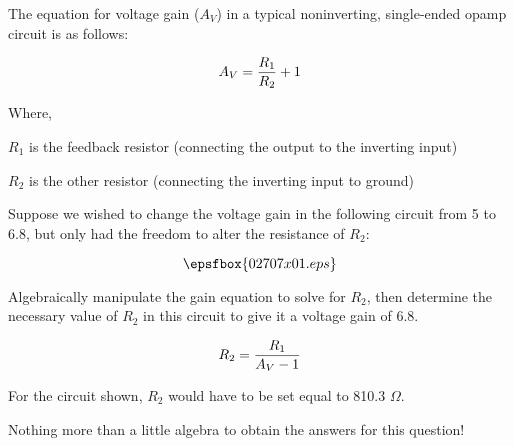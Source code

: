 

The equation for voltage gain ($A_V$) in a typical noninverting, single-ended opamp circuit is as follows:

$$A_V = {R_{1} \over R_{2}} + 1$$

\noindent
Where,

$R_1$ is the feedback resistor (connecting the output to the inverting input)

$R_2$ is the other resistor (connecting the inverting input to ground)

\vskip 10pt

Suppose we wished to change the voltage gain in the following circuit from 5 to 6.8, but only had the freedom to alter the resistance of $R_{2}$:

$$\epsfbox{02707x01.eps}$$

Algebraically manipulate the gain equation to solve for $R_2$, then determine the necessary value of $R_2$ in this circuit to give it a voltage gain of 6.8.







$$R_2 = {R_1 \over {A_V - 1}}$$

\vskip 10pt

For the circuit shown, $R_2$ would have to be set equal to 810.3 $\Omega$.







Nothing more than a little algebra to obtain the answers for this question!





